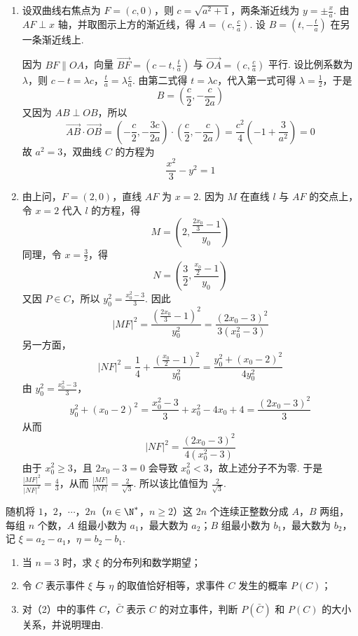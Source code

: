 \begin{solution}
\begin{enumerate}
\item 设双曲线右焦点为 \(F=(c,0)\)，则 \(c=\sqrt{a^2+1}\)，两条渐近线为 \(y=\pm\frac{x}{a}\). 由 \(AF\perp x\) 轴，并取图示上方的渐近线，得 \(A=\left(c,\frac{c}{a}\right)\). 设 \(B=\left(t,-\frac{t}{a}\right)\) 在另一条渐近线上.

因为 \(BF\parallel OA\)，向量 \(\overrightarrow{BF}=\left(c-t,\frac{t}{a}\right)\) 与 \(\overrightarrow{OA}=\left(c,\frac{c}{a}\right)\) 平行. 设比例系数为 \(\lambda\)，则 \(c-t=\lambda c\)，\(\frac{t}{a}=\lambda\frac{c}{a}\).
由第二式得 \(t=\lambda c\)，代入第一式可得 \(\lambda=\frac{1}{2}\)，于是
\[
B=\left(\frac{c}{2},-\frac{c}{2a}\right)
\]
又因为 \(AB\perp OB\)，所以
\[
\overrightarrow{AB}\cdot\overrightarrow{OB}
=\left(-\frac{c}{2},-\frac{3c}{2a}\right)\cdot\left(\frac{c}{2},-\frac{c}{2a}\right)
=\frac{c^2}{4}\left(-1+\frac{3}{a^2}\right)=0
\]
故 \(a^2=3\)，双曲线 \(C\) 的方程为
\[
\frac{x^2}{3}-y^2=1
\]

\item 由上问，\(F=(2,0)\)，直线 \(AF\) 为 \(x=2\). 因为 \(M\) 在直线 \(l\) 与 \(AF\) 的交点上，令 \(x=2\) 代入 \(l\) 的方程，得
\[
M=\left(2,\frac{\frac{2x_0}{3}-1}{y_0}\right)
\]
同理，令 \(x=\frac{3}{2}\)，得
\[
N=\left(\frac{3}{2},\frac{\frac{x_0}{2}-1}{y_0}\right)
\]
又因 \(P\in C\)，所以 \(y_0^2=\frac{x_0^2-3}{3}\). 因此
\[
|MF|^2=\frac{\left(\frac{2x_0}{3}-1\right)^2}{y_0^2}=\frac{(2x_0-3)^2}{3(x_0^2-3)}
\]
另一方面，
\[
|NF|^2=\frac{1}{4}+\frac{\left(\frac{x_0}{2}-1\right)^2}{y_0^2}=\frac{y_0^2+(x_0-2)^2}{4y_0^2}
\]
由 \(y_0^2=\frac{x_0^2-3}{3}\)，
\[
y_0^2+(x_0-2)^2=\frac{x_0^2-3}{3}+x_0^2-4x_0+4=\frac{(2x_0-3)^2}{3}
\]
从而
\[
|NF|^2=\frac{(2x_0-3)^2}{4(x_0^2-3)}
\]
由于 \(x_0^2\geqslant 3\)，且 \(2x_0-3=0\) 会导致 \(x_0^2<3\)，故上述分子不为零. 于是 \(\frac{|MF|^2}{|NF|^2}=\frac{4}{3}\)，从而 \(\frac{|MF|}{|NF|}=\frac{2}{\sqrt{3}}\). 所以该比值恒为 \(\frac{2}{\sqrt{3}}\).
\end{enumerate}
\end{solution}

\begin{problem}
随机将 \(1\)，\(2\)，\(\cdots\)，\(2n\)（\(n \in \N^{*}\)，\(n \geqslant 2\)）这 \(2n\) 个连续正整数分成 \(A\)，\(B\) 两组，每组 \(n\) 个数，\(A\) 组最小数为 \( a_{1} \)，最大数为 \( a_{2} \)；\(B\) 组最小数为 \( b_{1} \)，最大数为 \( b_{2} \)，记 \( \xi = a_{2} - a_{1} \)，\( \eta = b_{2} - b_{1} \).

\begin{enumerate}
\item 当 \(n = 3\) 时，求 \(\xi\) 的分布列和数学期望；
\item 令 \(C\) 表示事件 \(\xi\) 与 \(\eta\) 的取值恰好相等，求事件 \(C\) 发生的概率 \(P(C)\)；
\item 对（2）中的事件 \(C\)，\(\bar{C}\) 表示 \(C\) 的对立事件，判断 \(P(\bar{C})\) 和 \(P(C)\) 的大小关系，并说明理由.
\end{enumerate}
\end{problem}

